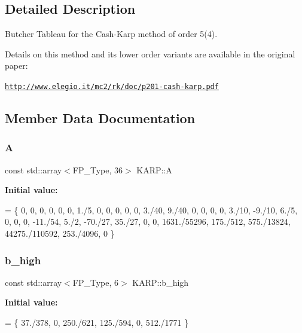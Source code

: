\subsection{Detailed Description}
Butcher Tableau for the Cash-\/\+Karp method of order 5(4). 

Details on this method and its lower order variants are available in the original paper\+:

\href{http://www.elegio.it/mc2/rk/doc/p201-cash-karp.pdf}{\tt http\+://www.\+elegio.\+it/mc2/rk/doc/p201-\/cash-\/karp.\+pdf} 

\subsection{Member Data Documentation}
\mbox{\label{structKARP_a5e62cee865e772c7a7e7072f578c658d}} 
\subsubsection{\texorpdfstring{A}{A}}
{\footnotesize\ttfamily const std\+::array$<$F\+P\+\_\+\+Type, 36$>$ K\+A\+R\+P\+::A}

{\bfseries Initial value\+:}
\begin{DoxyCode}
= \{
    0,            0,         0,           0,              0,          0,
    1./5,         0,         0,           0,              0,          0,
    3./40,        9./40,     0,           0,              0,          0,
    3./10,        -9./10,    6./5,        0,              0,          0,
    -11./54,      5./2,      -70./27,     35./27,         0,          0,
    1631./55296,  175./512,  575./13824,  44275./110592,  253./4096,  0
  \}
\end{DoxyCode}
\mbox{\label{structKARP_af682eefba6a62bb8bf72efc293e2e361}} 
\subsubsection{\texorpdfstring{b\+\_\+high}{b\_high}}
{\footnotesize\ttfamily const std\+::array$<$F\+P\+\_\+\+Type, 6$>$ K\+A\+R\+P\+::b\+\_\+high}

{\bfseries Initial value\+:}
\begin{DoxyCode}
= \{
    37./378, 0, 250./621, 125./594, 0, 512./1771
  \}
\end{DoxyCode}
\mbox{\label{structKARP_a2833bea5896058e8ad8256a41e4e04d2}} 
